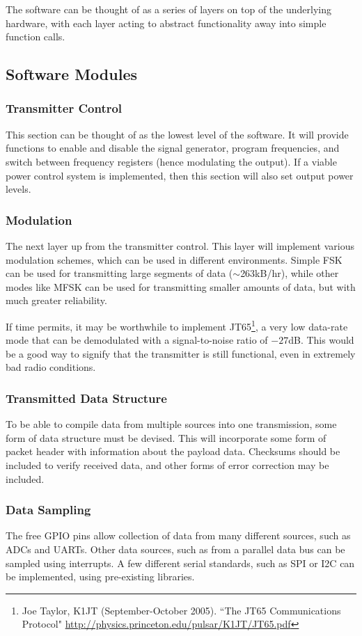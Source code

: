 \documentclass[a4paper,12pt]{article}
\begin{document}
The software can be thought of as a series of layers on top of the underlying hardware, with each layer acting to abstract functionality away into simple function calls. 

\subsection{Software Modules}
\subsubsection{Transmitter Control} 
This section can be thought of as the lowest level of the software. It will provide functions to enable and disable the signal generator, program frequencies, and switch between frequency registers (hence modulating the output). If a viable power control system is implemented, then this section will also set output power levels. 

\subsubsection{Modulation}
The next layer up from the transmitter control. This layer will implement various modulation schemes, which can be used in different environments. Simple FSK can be used for transmitting large segments of data ($\sim$263kB/hr), while other modes like MFSK can be used for transmitting smaller amounts of data, but with much greater reliability. 

If time permits, it may be worthwhile to implement JT65\footnote{Joe Taylor, K1JT (September-October 2005). ``The JT65 Communications Protocol" \url{http://physics.princeton.edu/pulsar/K1JT/JT65.pdf}}, a very low data-rate mode that can be demodulated with a signal-to-noise ratio of $-27$dB. This would be a good way to signify that the transmitter is still functional, even in extremely bad radio conditions.

\subsubsection{Transmitted Data Structure}
To be able to compile data from multiple sources into one transmission, some form of data structure must be devised. This will incorporate some form of packet header with information about the payload data. Checksums should be included to verify received data, and other forms of error correction may be included.

\subsubsection{Data Sampling}
The free GPIO pins allow collection of data from many different sources, such as ADCs and UARTs. Other data sources, such as from a parallel data bus can be sampled using interrupts. A few different serial standards, such as SPI or I2C can be implemented, using pre-existing libraries. 
\end{document}
